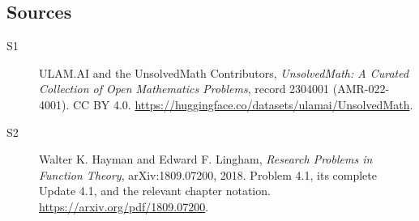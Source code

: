 \documentclass[11pt]{book}
\begin{document}
\subsection{Sources}
\begin{description}
\item[\hypertarget{source:2304001:1}{S1}] ULAM.AI and the UnsolvedMath Contributors, \emph{UnsolvedMath: A Curated Collection of Open Mathematics Problems}, record 2304001 (AMR-022-4001). CC BY 4.0. \url{https://huggingface.co/datasets/ulamai/UnsolvedMath}.
\item[\hypertarget{source:2304001:2}{S2}] Walter K. Hayman and Edward F. Lingham, \emph{Research Problems in Function Theory}, arXiv:1809.07200, 2018. Problem 4.1, its complete Update 4.1, and the relevant chapter notation. \url{https://arxiv.org/pdf/1809.07200}.
\end{description}
\label{end:2304001}
\end{document}
